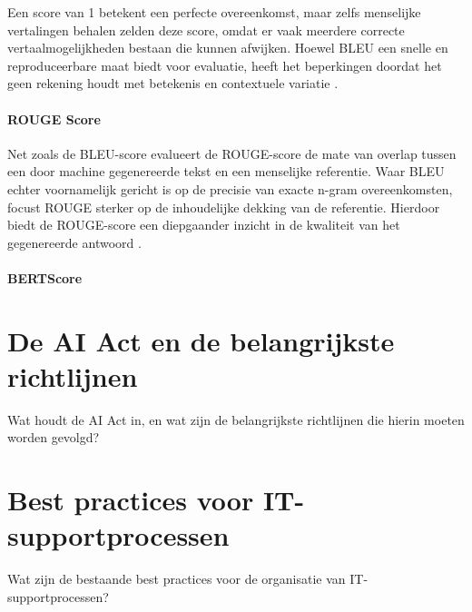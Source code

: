     Een score van 1 betekent een perfecte overeenkomst, maar zelfs menselijke vertalingen behalen zelden deze score, omdat er vaak meerdere correcte vertaalmogelijkheden bestaan die kunnen afwijken. Hoewel BLEU een snelle en reproduceerbare maat biedt voor evaluatie, heeft het beperkingen doordat het geen rekening houdt met betekenis en contextuele variatie \cite{papineni-etal-2002-bleu}.
    
    \paragraph{ROUGE Score}
    
    Net zoals de BLEU-score evalueert de ROUGE-score de mate van overlap tussen een door machine gegenereerde tekst en een menselijke referentie. Waar BLEU echter voornamelijk gericht is op de precisie van exacte n-gram overeenkomsten, focust ROUGE sterker op de inhoudelijke dekking van de referentie. Hierdoor biedt de ROUGE-score een diepgaander inzicht in de kwaliteit van het gegenereerde antwoord \cite{Ganesan2018}.
    
    \paragraph{BERTScore}

\section{De AI Act en de belangrijkste richtlijnen}
Wat houdt de AI Act in, en wat zijn de belangrijkste richtlijnen die hierin moeten worden gevolgd?

\section{Best practices voor IT-supportprocessen}
Wat zijn de bestaande best practices voor de organisatie van IT-supportprocessen?
